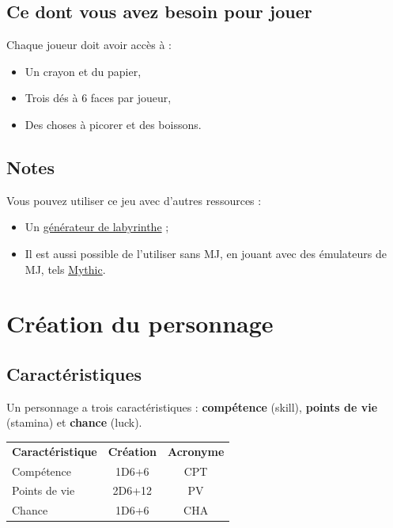 \documentclass[a4paper, 11pt, twoside]{article}
\begin{document}
\subsection{Ce dont vous avez besoin pour jouer}
\label{sec:org082180d}

Chaque joueur doit avoir accès à :
\begin{itemize}
\item Un crayon et du papier,
\item Trois dés à 6 faces par joueur,
\item Des choses à picorer et des boissons.
\end{itemize}

\subsection{Notes}
\label{sec:org359e7f0}

Vous pouvez utiliser ce jeu avec d'autres ressources :
\begin{itemize}
\item Un \href{https://github.com/orey/jdr/tree/master/G\%25C3\%25A9n\%25C3\%25A9rateurLabyrinthe}{générateur de labyrinthe} ;
\item Il est aussi possible de l'utiliser sans MJ, en jouant avec des émulateurs de MJ, tels \href{https://github.com/orey/jdr/tree/master/Mythic-fr}{Mythic}.
\end{itemize}

\section{Création du personnage}
\label{sec:org8a5a8d0}

\subsection{Caractéristiques}
\label{sec:org86a6918}

Un personnage a trois caractéristiques : \textbf{compétence} (skill), \textbf{points de vie} (stamina)  et \textbf{chance} (luck).

\begin{longtable}{lcc}
\textbf{Caractéristique} & \textbf{Création} & \textbf{Acronyme}\\
Compétence & 1D6+6 & CPT\\
Points de vie & 2D6+12 & PV\\
Chance & 1D6+6 & CHA\\
\end{longtable}
\end{document}
